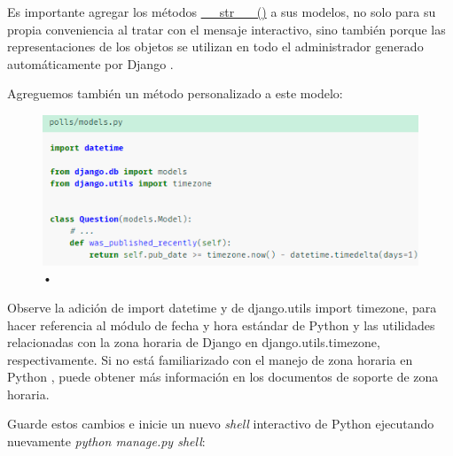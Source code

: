 \documentclass[10pt]{article}
\newcommand{\py}[1]{{\textcolor{B}{Python} #1}}
\newcommand{\django}[1]{{\textcolor{G}{Django} #1}}
\begin{document}
Es importante agregar los métodos {\href{https://docs.djangoproject.com/en/3.0/ref/models/instances/\#django.db.models.Model.\_\_str\_\_()}{\textcolor{B}{\_\_str \_\_()}}} a sus modelos, no solo para su propia conveniencia al tratar con el mensaje interactivo, sino también porque las representaciones de los objetos se utilizan en todo el administrador generado automáticamente por \django{}.

Agreguemos también un método personalizado a este modelo:
\\
\begin{figure}[H]
\begin{center}
\renewcommand{\arraystretch}{1.3}
\includegraphics[scale=1]{figuras/324/img3.png}
\caption{•}
\end{center}
\end{figure}

Observe la adición de \textcolor{G}{import datetime} y de \textcolor{G}{django.utils import timezone}, para hacer referencia al módulo de fecha y hora estándar de \py{} y las utilidades relacionadas con la zona horaria de \django{} en \textcolor{G}{django.utils.timezone}, respectivamente. Si no está familiarizado con el manejo de zona horaria en \py{}, puede obtener más información en los documentos de soporte de zona horaria.


Guarde estos cambios e inicie un nuevo \textit{shell} interactivo de \py{} ejecutando nuevamente \textit{python manage.py shell}:
\end{document}
